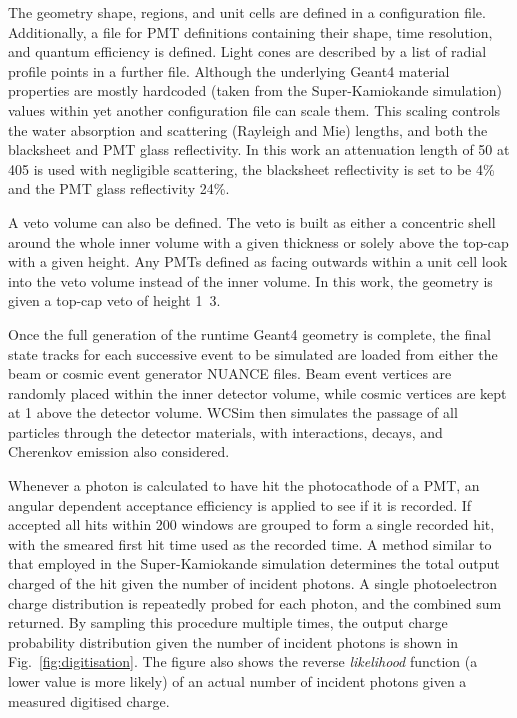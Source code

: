 The geometry shape, regions, and unit cells are defined in a configuration file. Additionally, a
file for PMT definitions containing their shape, time resolution, and quantum efficiency is
defined. Light cones are described by a list of radial profile points in a further file. Although
the underlying Geant4 material properties are mostly hardcoded (taken from the Super-Kamiokande
simulation) values within yet another configuration file can scale them. This scaling controls the
water absorption and scattering (Rayleigh and Mie) lengths, and both the blacksheet and PMT glass
reflectivity. In this work an attenuation length of \unit{50}{} at
\unit{405}{} is used with negligible scattering, the blacksheet reflectivity is set to
be 4\% and the PMT glass reflectivity 24\%.

A veto volume can also be defined. The veto is built as either a concentric shell around the whole
inner volume with a given thickness or solely above the top-cap with a given height. Any PMTs
defined as facing outwards within a unit cell look into the veto volume instead of the inner
volume. In this work, the \chipsfive geometry is given a top-cap veto of height
\unit{1.3}{}.

Once the full generation of the runtime Geant4 geometry is complete, the final state tracks for
each successive event to be simulated are loaded from either the beam or cosmic event generator
NUANCE files. Beam event vertices are randomly placed within the inner detector volume, while
cosmic vertices are kept at \unit{1}{} above the detector volume. WCSim then simulates
the passage of all particles through the detector materials, with interactions, decays, and
Cherenkov emission also considered.

Whenever a photon is calculated to have hit the photocathode of a PMT, an angular dependent
acceptance efficiency is applied to see if it is recorded. If accepted all hits within
\unit{200}{} windows are grouped to form a single recorded hit, with the smeared first
hit time used as the recorded time. A method similar to that employed in the Super-Kamiokande
simulation determines the total output charged of the hit given the number of incident photons. A
single photoelectron charge distribution is repeatedly probed for each photon, and the combined
sum returned. By sampling this procedure multiple times, the output charge probability
distribution given the number of incident photons is shown in Fig.~\ref{fig:digitisation}. The
figure also shows the reverse \emph{likelihood} function (a lower value is more likely) of an
actual number of incident photons given a measured digitised charge.

